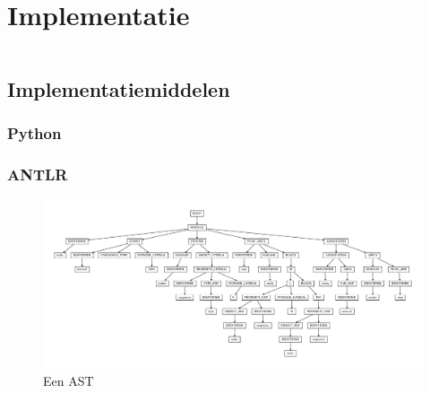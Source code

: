 
\chapter{Implementatie}
\label{chapter:implementatie}

\TODO

\inputminted[linenos,frame=lines,framesep=2mm,fontsize=\footnotesize]{js}{../src/foo-lang/examples/hello.foo}
\vspace{-5mm}

\section{Implementatiemiddelen}
\label{section:devel-tools}

\TODO

\subsection{Python}
\label{subsection:devel-python}

\TODO

\subsection{ANTLR}
\label{subsection:devel-antlr}

\TODO

\begin{figure}[ht]
  \centering
  \includegraphics[width=\linewidth]{resources/hello_ast.pdf}
  \caption{Een AST}
  \label{fig:devel-ast}
\end{figure}
